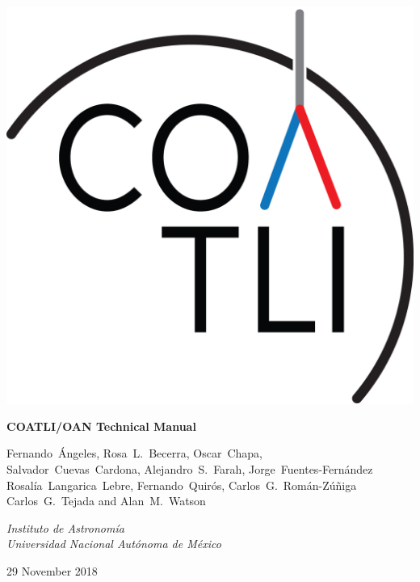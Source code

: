 
\pagestyle{empty}

\begin{centering}

\ifcoatlioan
\bigskip
\bigskip
\includegraphics[width=\linewidth]{figures/logo-gn.png}
\bigskip
\bigskip
{
 \Large
 \bfseries 
 COATLI/OAN Technical Manual
 \par
}
\bigskip
{
\baselineskip=10pt
 \large
 Fernando~Ángeles,
 Rosa~L.~Becerra,
 Oscar~Chapa,\\
 Salvador~Cuevas~Cardona,
 Alejandro~S.~Farah,
 Jorge~Fuentes-Fernández\\
 Rosalía~Langarica~Lebre,
 Fernando~Quirós,
 Carlos~G.~Román-Zúñiga\\
 Carlos~G.~Tejada
 and
 Alan~M.~Watson
 \par
}
\bigskip
{
 \large
 \itshape 
 Instituto de Astronomía\\
 Universidad Nacional Autónoma de México
 \par
}
\bigskip
{
 \large
 29 November 2018
}
\fi

\ifddotioan
\bigskip
\bigskip


\end{centering}
